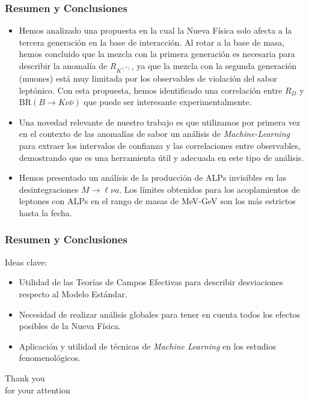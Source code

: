 \documentclass[mathserif, 10pt, dvipsnames]{beamer}
\begin{document}
\begin{frame}\frametitle{Resumen y Conclusiones}
    \begin{itemize}
        \item Hemos analizado una propuesta en la cual la Nueva Física solo afecta a la tercera generación en la base de interacción. Al rotar a la base de masa, hemos concluido que la mezcla con la primera generación es necesaria para describir la anomalía de $R_{K^{(*)}}$, ya que la mezcla con la segunda generación (muones) está muy limitada por los observables de violación del sabor leptónico. Con esta propuesta, hemos identificado una correlación entre $R_D$ y $\mathrm{BR}(B\to K\nu\bar{\nu})$ que puede ser interesante experimentalmente.
        \item Una novedad relevante de nuestro trabajo es que utilizamos por primera vez en el contexto de las anomalías de sabor un análisis de \textit{Machine-Learning} para extraer los intervalos de confianza y las correlaciones entre observables, demostrando que es una herramienta útil y adecuada en este tipo de análisis.
        \item Hemos presentado un análisis de la producción de ALPs invisibles en las desintegraciones $M\to \ell \nu a$. Los límites obtenidos para los acoplamientos de leptones con ALPs en el rango de masas de MeV-GeV son los más estrictos hasta la fecha.
    \end{itemize}
\end{frame}

\begin{frame}\frametitle{Resumen y Conclusiones}

    Ideas clave:

    \vspace{0.5cm}

    \begin{itemize}
        \item Utilidad de las Teorías de Campos Efectivas para describir desviaciones respecto al Modelo Estándar.
        \item Necesidad de realizar análisis globales para tener en cuenta todos los efectos posibles de la Nueva Física.
        \item Aplicación y utilidad de técnicas de \textit{Machine Learning} en los estudios fenomenológicos.
    \end{itemize}
\end{frame}

\appendix

\begin{frame}
    \begin{center}
        {\huge \color{unizarblue} Thank you\\ for your attention}
    \end{center}
\end{frame}
\end{document}

